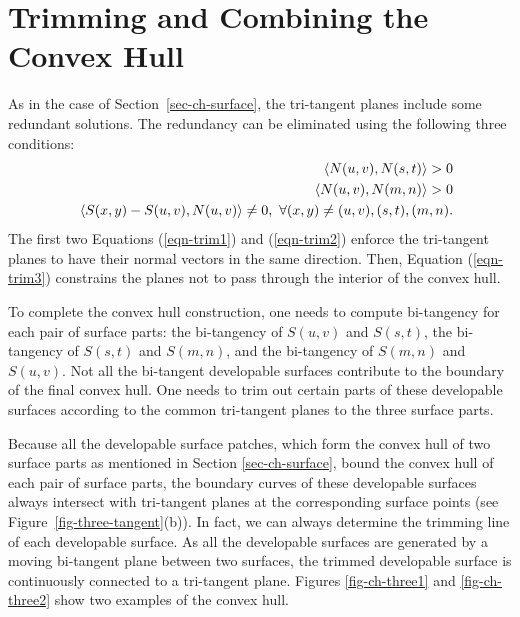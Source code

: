 \documentclass[doublespacing]{elsart}
\begin{document}
\section{Trimming and Combining the Convex Hull}
\label{sec-trim-combine}

As in the case of Section~\ref{sec-ch-surface}, the tri-tangent planes
include some redundant solutions.
The redundancy can be eliminated using the following three conditions:
\begin{eqnarray}
& & \inner{N(u,v)}{N(s,t)} > 0 \label{eqn-trim1} \\
& & \inner{N(u,v)}{N(m,n)} > 0 \label{eqn-trim2} \\
& & \inner{S(x,y) - S(u,v)}{N(u,v)} \neq 0,\ 
\forall (x,y) \neq (u,v), (s,t), (m,n). \label{eqn-trim3}
\end{eqnarray}
The first two Equations (\ref{eqn-trim1}) and (\ref{eqn-trim2}) enforce 
the tri-tangent planes to have their normal vectors in the same direction. 
Then, Equation (\ref{eqn-trim3}) constrains the planes
not to pass through the interior of the convex hull.

To complete the convex hull construction, one needs to compute 
bi-tangency for each pair of surface parts: the bi-tangency of $S(u,v)$ and 
$S(s,t)$, the bi-tangency of $S(s,t)$ and $S(m,n)$, and the bi-tangency
of $S(m,n)$ and $S(u,v)$. Not all the bi-tangent developable surfaces
contribute to the boundary of the final convex hull. One needs to trim out
certain parts of these developable surfaces according to
the common tri-tangent planes to the three surface parts.

Because all the developable surface patches, which form the convex hull of 
two surface parts as mentioned in Section \ref{sec-ch-surface}, bound
the convex hull of each pair of surface parts, the boundary curves of these 
developable surfaces always intersect with tri-tangent planes
at the corresponding surface points (see Figure~\ref{fig-three-tangent}(b)).
In fact, we can always determine the trimming line of each developable surface.
As all the developable surfaces are generated by a moving bi-tangent plane 
between two surfaces, the trimmed developable surface is continuously 
connected to a tri-tangent plane.
Figures \ref{fig-ch-three1} and \ref{fig-ch-three2} show
two examples of the convex hull.
\end{document}
